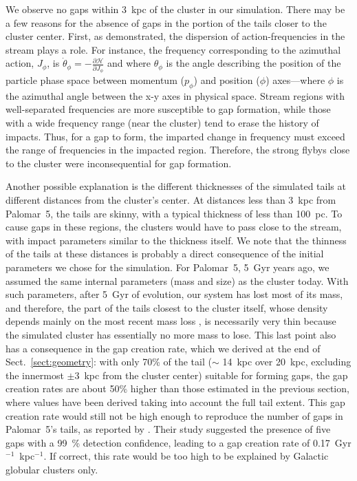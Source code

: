 \documentclass{aa}
\begin{document}
    We observe no gaps within 3~kpc of the cluster in our simulation. There may be a few reasons for the absence of gaps in the portion of the tails closer to the cluster center. First, as \citet{2016MNRAS.457.3817S} demonstrated, the dispersion of action-frequencies in the stream plays a role. For instance, the frequency corresponding to the azimuthal action, $J_\phi$, is $\dot\theta_\phi = - \frac{\mathcal{\partial H}}{\partial J_\phi}$ and where $\theta_\phi$ is the angle describing the position of the particle phase space between momentum ($p_\phi$) and position ($\phi$) axes---where $\phi$ is the azimuthal angle between the x-y axes in physical space. Stream regions with well-separated frequencies are more susceptible to gap formation, while those with a wide frequency range (near the cluster) tend to erase the history of impacts. Thus, for a gap to form, the imparted change in frequency must exceed the range of frequencies in the impacted region. Therefore, the strong flybys close to the cluster were inconsequential for gap formation. 
    
    Another possible explanation is the different thicknesses of the simulated tails at different distances from the cluster's center. At distances less than 3~kpc from Palomar~5, the tails are skinny, with a typical thickness of less than 100~pc. To cause gaps in these regions, the clusters would have to pass close to the stream, with impact parameters similar to the thickness itself. We note that the thinness of the tails at these distances is probably a direct consequence of the initial parameters we chose for the simulation. For Palomar~5, 5~Gyr years ago, we assumed the same internal parameters (mass and size) as the cluster today. With such parameters, after 5~Gyr of evolution, our system has lost most of its mass, and therefore, the part of the tails closest to the cluster itself, whose density depends mainly on the most recent mass loss \citep[see, for example, Fig.~A.3 in][]{2012A&A...546L...7M}, is necessarily very thin because the simulated cluster has essentially no more mass to lose. This last point also has a consequence in the gap creation rate, which we derived at the end of Sect.~\ref{sect:geometry}: with only 70\% of the tail  ($\sim$ 14~kpc over 20~kpc, excluding the innermost $\pm 3$~kpc from the cluster center) suitable for forming gaps, the gap creation rates are about 50$\%$ higher than those estimated in the previous section, where values have been derived taking into account the full tail extent. This gap creation rate would still not be high enough to reproduce the number of gaps in Palomar~5's tails, as reported by \citet{2012ApJ...760...75C}. Their study suggested the presence of five gaps with a 99~\% detection confidence, leading to a gap creation rate of 0.17~Gyr$^{-1}$~kpc$^{-1}$. If correct, this rate would be too high to be explained by Galactic globular clusters only. 
\end{document}
